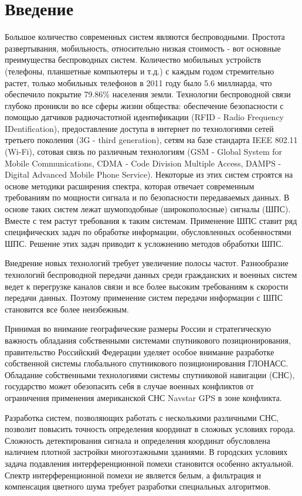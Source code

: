 \chapter*{Введение}

Большое количество современных систем являются беспроводными. Простота развертывания, мобильность, относительно низкая
стоимость - вот основные преимущества беспроводных систем. Количество мобильных устройств (телефоны, планшетные компьютеры
и т.д.) с каждым годом стремительно растет, только мобильных телефонов в 2011 году было 5.6 миллиарда, что обеспечило покрытие 79.86\%
\cite{wiki_mobilenum} населения земли. Технологии беспроводной связи глубоко проникли во все сферы жизни общества:
обеспечение безопасности с помощью датчиков радиочастотной идентификации (RFID - Radio Frequency IDentification),
предоставление доступа в интернет по технологиями сетей третьего поколения (3G - third generation), сетям на базе стандарта IEEE 802.11 (Wi-Fi),
сотовая связь по различным технологиям (GSM - Global System for Mobile Communications, CDMA - Code Division Multiple Access, DAMPS - Digital Advanced Mobile Phone Service).
Некоторые из этих систем строятся на основе методики
расширения спектра, которая отвечает современным требованиям по мощности сигнала и по безопасности передаваемых
данных. В основе таких систем лежат шумоподобные (широкополосные) сигналы (ШПС). Вместе с тем растут требования к таким
системам. Применение ШПС ставит ряд специфических задач по обработке информации, обусловленных особенностями ШПС.
Решение этих задач приводит к усложнению методов обработки ШПС.

Внедрение новых технологий требует увеличение полосы частот. Разнообразие технологий беспроводной передачи данных среди
гражданских и военных систем ведет к перегрузке каналов связи и все более высоким требованиям к скорости передачи
данных. Поэтому применение систем передачи информации с ШПС становится все более неизбежным.

Принимая во внимание географические размеры России и стратегическую важность обладания собственными системами спутникового
позиционирования, правительство Российский Федерации уделяет особое внимание разработке собственной системы
глобального спутникового позиционирования ГЛОНАСС. Обладание собственными технологиями системы спутниковой навигации (СНС), государство может обезопасить
себя в случае военных конфликтов от ограничения применения американской СНС Navstar GPS в зоне конфликта.

Разработка систем, позволяющих работать с несколькими различными СНС, позволит повысить точность определения координат
в сложных условиях города. Сложность детектирования сигнала и определения координат обусловлена наличием плотной
застройки многоэтажными зданиями. В городских условиях задача подавления интерференционной помехи становится особенно
актуальной. Спектр интерференционной помехи не является белым, а фильтрация и компенсация цветного шума
требует разработки специальных алгоритмов.


